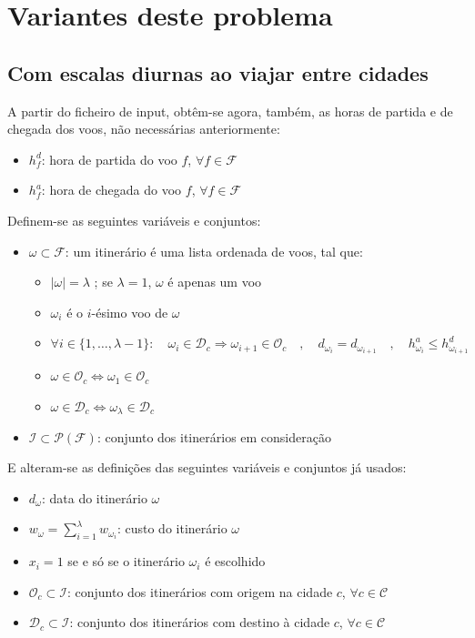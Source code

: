 \documentclass[12pt,a4paper]{article}
\begin{document}
    \section{Variantes deste problema}

    \subsection{Com escalas diurnas ao viajar entre cidades}
        A partir do ficheiro de input, obtêm-se agora, também, as horas de partida e de chegada dos voos, não necessárias anteriormente:
        \begin{itemize}
            \item $h_{f}^{d}$: hora de partida do voo $f$, $\forall f \in \mathcal{F}$
            \item $h_{f}^{a}$: hora de chegada do voo $f$, $\forall f \in \mathcal{F}$
        \end{itemize}
        Definem-se as seguintes variáveis e conjuntos:
        \begin{itemize}
            \item $\omega \subset \mathcal{F}$: um itinerário é uma lista ordenada de voos, tal que:
                \begin{itemize}
                    \item $\lvert \omega \rvert = \lambda$ ; \quad se $\lambda = 1$, $\omega$ é apenas um voo
                    \item $\omega_i$ é o $i$-ésimo voo de $\omega$
                    \item $\forall i \in \{1, \dots, \lambda-1\}: \quad \omega_i \in \mathcal{D}_c \Rightarrow \omega_{i+1} \in \mathcal{O}_c \quad , \quad d_{\omega_i} = d_{\omega_{i+1}} \quad , \quad h_{\omega_i}^{a} \leq h_{\omega_{i+1}}^{d}$
                    \item $\omega \in \mathcal{O}_c \Leftrightarrow \omega_1 \in \mathcal{O}_c$
                    \item $\omega \in \mathcal{D}_c \Leftrightarrow \omega_{\lambda} \in \mathcal{D}_c$
                \end{itemize}
            \item $\mathcal{I} \subset \mathcal{P}(\mathcal{F})$: conjunto dos itinerários em consideração
        \end{itemize}
        E alteram-se as definições das seguintes variáveis e conjuntos já usados:
        \begin{itemize}
            \item $d_\omega$: data do itinerário $\omega$
            \item $w_\omega = \sum_{i = 1}^{\lambda}{w_{\omega_i}}$: custo do itinerário $\omega$
            \item $x_i = 1$ se e só se o itinerário $\omega_i$ é escolhido
            \item $\mathcal{O}_c \subset \mathcal{I}$: conjunto dos itinerários com origem na cidade $c$, $\forall c \in \mathcal{C}$
            \item $\mathcal{D}_c \subset \mathcal{I}$: conjunto dos itinerários com destino à cidade $c$, $\forall c \in \mathcal{C}$
        \end{itemize}
\end{document}
